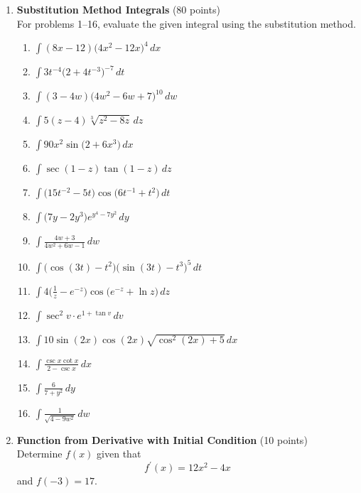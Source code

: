 \begin{enumerate}
  \item \textbf{Substitution Method Integrals} (80 points)\\
  For problems 1--16, evaluate the given integral using the substitution method.
  \begin{enumerate}
    \item $\displaystyle \int (8 x - 12)\bigl(4 x^2 - 12 x\bigr)^4 \,dx$
    \item $\displaystyle \int 3 t^{-4}\bigl(2 + 4 t^{-3}\bigr)^{-7} \,dt$
    \item $\displaystyle \int (3 - 4 w)\bigl(4 w^2 - 6 w + 7\bigr)^{10} \,dw$
    \item $\displaystyle \int 5(z - 4) \sqrt[3]{z^2 - 8 z} \,dz$
    \item $\displaystyle \int 90 x^2 \sin\bigl(2 + 6 x^3\bigr) \,dx$
    \item $\displaystyle \int \sec(1 - z) \tan(1 - z) \,dz$
    \item $\displaystyle \int \bigl(15 t^{-2} - 5 t\bigr) \cos\bigl(6 t^{-1} + t^2\bigr) \,dt$
    \item $\displaystyle \int \bigl(7 y - 2 y^3\bigr) e^{y^4 - 7 y^2} \,dy$
    \item $\displaystyle \int \frac{4 w + 3}{4 w^2 + 6 w - 1} \,dw$
    \item $\displaystyle \int \bigl(\cos(3 t) - t^2\bigr)\bigl(\sin(3 t) - t^3\bigr)^5 \,dt$
    \item $\displaystyle \int 4\biggl(\frac{1}{z} - e^{-z}\biggr) \cos\bigl(e^{-z} + \ln z\bigr) \,dz$
    \item $\displaystyle \int \sec^2 v \cdot e^{1 + \tan v} \,dv$
    \item $\displaystyle \int 10 \sin(2 x) \cos(2 x) \sqrt{\cos^2(2 x) + 5} \,dx$
    \item $\displaystyle \int \frac{\csc x \cot x}{2 - \csc x} \,dx$
    \item $\displaystyle \int \frac{6}{7 + y^2} \,dy$
    \item $\displaystyle \int \frac{1}{\sqrt{4 - 9 w^2}} \,dw$
  \end{enumerate}

  \item \textbf{Function from Derivative with Initial Condition} (10 points)\\
  Determine $f(x)$ given that
  \[
    f^{\prime}(x) = 12 x^2 - 4 x
  \]
  and $f(-3) = 17$.
  \begin{subanswer}
  \end{subanswer}


\end{enumerate}
